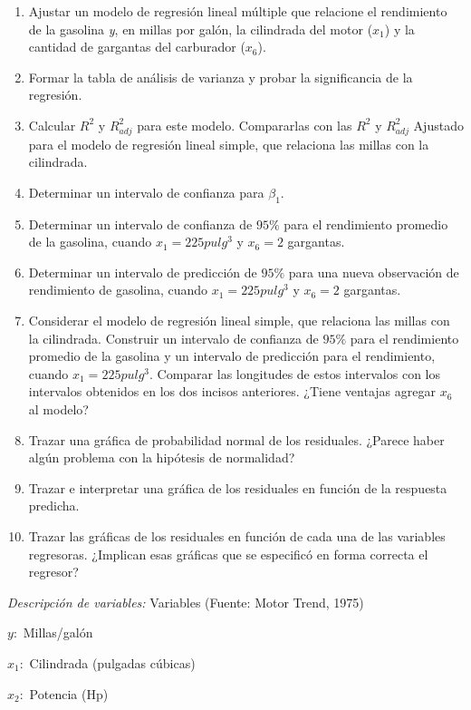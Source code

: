 \documentclass[
]{book}
\begin{document}
\begin{enumerate}
\def\labelenumi{\alph{enumi})}
\item
  Ajustar un modelo de regresión lineal múltiple que relacione el rendimiento de la gasolina \emph{y}, en millas por galón, la cilindrada del motor (\(x_1\)) y la cantidad de gargantas del carburador (\(x_6\)).
\item
  Formar la tabla de análisis de varianza y probar la significancia de la regresión.
\item
  Calcular \(R^2\) y \(R^2_{adj}\) para este modelo. Compararlas con las \(R^2\) y \(R^2_{adj}\) Ajustado para el modelo de regresión lineal simple, que relaciona las millas con la cilindrada.
\item
  Determinar un intervalo de confianza para \(\beta_1\).
\item
  Determinar un intervalo de confianza de \(95\%\) para el rendimiento promedio de la gasolina, cuando \(x_1 = 225 pulg^3\) y \(x_6 = 2\) gargantas.
\item
  Determinar un intervalo de predicción de \(95\%\) para una nueva observación de rendimiento de gasolina, cuando \(x_1 = 225 pulg^3\) y \(x_6 = 2\) gargantas.
\item
  Considerar el modelo de regresión lineal simple, que relaciona las millas con la cilindrada. Construir un intervalo de confianza de \(95\%\) para el rendimiento promedio de la gasolina y un intervalo de predicción para el rendimiento, cuando \(x_1 = 225 pulg^3\). Comparar las longitudes de estos intervalos con los intervalos obtenidos en los dos incisos anteriores. ¿Tiene ventajas agregar \(x_6\) al modelo?
\item
  Trazar una gráfica de probabilidad normal de los residuales. ¿Parece haber algún problema con la hipótesis de normalidad?
\item
  Trazar e interpretar una gráfica de los residuales en función de la respuesta predicha.
\item
  Trazar las gráficas de los residuales en función de cada una de las variables regresoras. ¿Implican esas gráficas que se especificó en forma correcta el regresor?
\end{enumerate}

\emph{Descripción de variables:} Variables (Fuente: Motor Trend, 1975)

\(y:\) Millas/galón

\(x_1:\) Cilindrada (pulgadas cúbicas)

\(x_2:\) Potencia (Hp)
\end{document}
